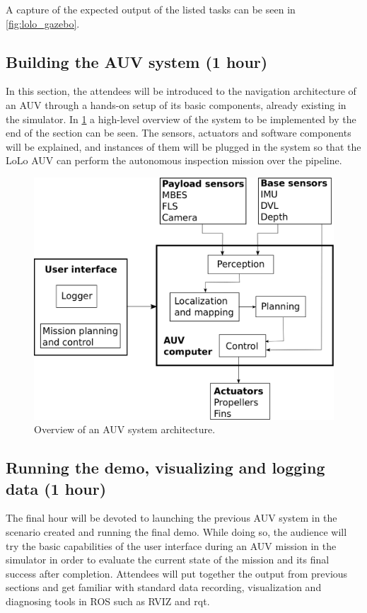 \documentclass[
10pt, %
a4paper, %
oneside, %
headinclude,footinclude, %
BCOR5mm, %
]{scrartcl}
\begin{document}
A capture of the expected output of the listed tasks can be seen in \ref{fig:lolo_gazebo}.

\subsection{\textbf{Building the AUV system (1 hour)}}
In this section, the attendees will be introduced to the navigation architecture of an AUV through a hands-on setup of its basic components, already existing in the simulator.
In \ref{fig:auv_system} a high-level overview of the system to be implemented by the end of the section can be seen.
The sensors, actuators and software components will be explained, and instances of them will be plugged in the system so that the LoLo AUV can perform the autonomous inspection mission over the pipeline.

\begin{figure}[h]
    \centering
    \includegraphics[width=0.9\linewidth]{Figures/auv_system.png}
    \caption{Overview of an AUV system architecture.}
\label{fig:auv_system}
\end{figure}


\subsection{\textbf{Running the demo, visualizing and logging data (1 hour)}}
The final hour will be devoted to launching the previous AUV system in the scenario created and running the final demo.
While doing so, the audience will try the basic capabilities of the user interface during an AUV mission in the simulator in order to evaluate the current state of the mission and its final success after completion.
Attendees will put together the output from previous sections and get familiar with standard data recording, visualization and diagnosing tools in ROS such as RVIZ and rqt.
\end{document}
